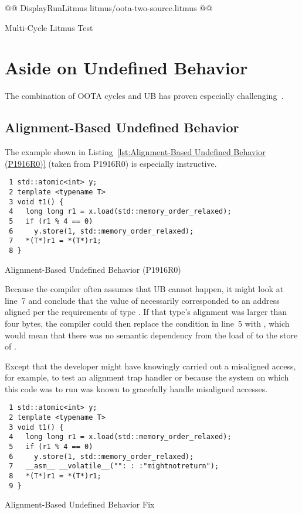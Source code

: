 \documentclass[10]{article}
\begin{document}
\begin{listing}[tbp]
@@ DisplayRunLitmus litmus/oota-two-source.litmus @@
\caption{Multi-Cycle Litmus Test}
\label{lst:Multi-Cycle Litmus Test}
\end{listing}

\section{Aside on Undefined Behavior}
\label{app:Aside on Undefined Behavior}

The combination of OOTA cycles and UB has proven especially
challenging~\cite{DavidGoldblatt2019NoElegantOOTAfix}.

\subsection{Alignment-Based Undefined Behavior}
\label{sec:Alignment-Based Undefined Behavior}

The example shown in
Listing~\ref{lst:Alignment-Based Undefined Behavior (P1916R0)}
(taken from P1916R0) is especially instructive.

\begin{listing}[tbp]
\begin{verbatim}
 1 std::atomic<int> y;
 2 template <typename T>
 3 void t1() {
 4   long long r1 = x.load(std::memory_order_relaxed);
 5   if (r1 % 4 == 0)
 6     y.store(1, std::memory_order_relaxed);
 7   *(T*)r1 = *(T*)r1;
 8 }
\end{verbatim}
\caption{Alignment-Based Undefined Behavior (P1916R0)}
\label{lst:Alignment-Based Undefined Behavior (P1916R0)}
\end{listing}

Because the compiler often assumes that UB cannot happen, it might
look at line~7 and conclude that the value of  necessarily
corresponded to an address aligned per the requirements of type .
If that type's alignment was larger than four bytes, the compiler could
then replace the condition in line~5 with , which would mean
that there was no semantic dependency from the load of  to the
store of .

Except that the developer might have knowingly carried out a misaligned
access, for example, to test an alignment trap handler or because the
system on which this code was to run was known to gracefully handle
misaligned accesses.

\begin{listing}[tbp]
\begin{verbatim}
 1 std::atomic<int> y;
 2 template <typename T>
 3 void t1() {
 4   long long r1 = x.load(std::memory_order_relaxed);
 5   if (r1 % 4 == 0)
 6     y.store(1, std::memory_order_relaxed);
 7   __asm__ __volatile__("": : :"mightnotreturn");
 8   *(T*)r1 = *(T*)r1;
 9 }
\end{verbatim}
\caption{Alignment-Based Undefined Behavior Fix}
\label{lst:Alignment-Based Undefined Behavior Fix}
\end{listing}
\end{document}
